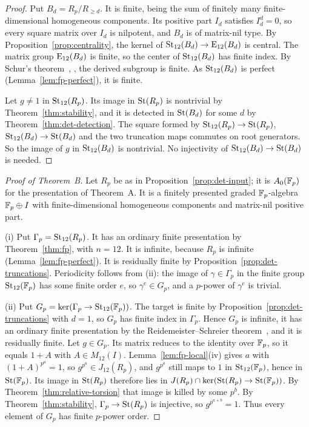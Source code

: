 \begin{proof}
Put $B_d=R_p/R_{\geq d}$. It is finite, being the sum of finitely many finite-dimensional homogeneous components. Its
positive part $I_d$ satisfies $I_d^d=0$, so every square matrix over $I_d$ is nilpotent, and $B_d$ is of matrix-nil
type. By Proposition~\ref{prop:centrality}, the kernel of $\operatorname{St}_{12}(B_d)\to\operatorname{E}_{12}(B_d)$ is central. The matrix group
$\operatorname{E}_{12}(B_d)$ is finite, so the center of $\operatorname{St}_{12}(B_d)$ has finite index. By Schur's theorem~\cite{Schur1904},
\cite[Theorem~10.1.4]{Robinson1996}, the derived subgroup is finite. As $\operatorname{St}_{12}(B_d)$ is perfect
(Lemma~\ref{lem:fp-perfect}), it is finite.

Let $g\neq1$ in $\operatorname{St}_{12}(R_p)$. Its image in $\operatorname{St}(R_p)$ is nontrivial by Theorem~\ref{thm:stability}, and it is detected
in $\operatorname{St}(B_d)$ for some $d$ by Theorem~\ref{thm:det-detection}. The square formed by $\operatorname{St}_{12}(R_p)\to\operatorname{St}(R_p)$,
$\operatorname{St}_{12}(B_d)\to\operatorname{St}(B_d)$ and the two truncation maps commutes on root generators. So the image of $g$ in
$\operatorname{St}_{12}(B_d)$ is nontrivial. No injectivity of $\operatorname{St}_{12}(B_d)\to\operatorname{St}(B_d)$ is needed.
\end{proof}

\begin{proof}[Proof of Theorem~B]
Let $R_p$ be as in Proposition~\ref{prop:det-input}; it is $A_0(\mathbb F_p)$ for the presentation of Theorem~A. It is a
finitely presented graded $\mathbb F_p$-algebra $\mathbb F_p\oplus I$ with finite-dimensional homogeneous components and matrix-nil
positive part.

(i) Put $\Gamma_p=\operatorname{St}_{12}(R_p)$. It has an ordinary finite presentation by Theorem~\ref{thm:fp}, with $n=12$. It is
infinite, because $R_p$ is infinite (Lemma~\ref{lem:fp-perfect}). It is residually finite by
Proposition~\ref{prop:det-truncations}. Periodicity follows from (ii): the image of $\gamma\in\Gamma_p$ in the finite
group $\operatorname{St}_{12}(\mathbb F_p)$ has some finite order $e$, so $\gamma^e\in G_p$, and a $p$-power of $\gamma^e$ is trivial.

(ii) Put $G_p=\ker(\Gamma_p\to\operatorname{St}_{12}(\mathbb F_p))$. The target is finite by Proposition~\ref{prop:det-truncations} with
$d=1$, so $G_p$ has finite index in $\Gamma_p$. Hence $G_p$ is infinite, it has an ordinary finite presentation by the
Reidemeister--Schreier theorem~\cite[Chapter~II, Section~4]{LyndonSchupp1977}, and it is residually finite. Let
$g\in G_p$. Its matrix reduces to the identity over $\mathbb F_p$, so it equals $1+A$ with $A\in M_{12}(I)$. Lemma~\ref{lem:fp-local}(iv)
gives $a$ with $(1+A)^{p^a}=1$, so $g^{p^a}\in J_{12}(R_p)$, and $g^{p^a}$ still maps to $1$ in $\operatorname{St}_{12}(\mathbb F_p)$, hence in
$\operatorname{St}(\mathbb F_p)$. Its image in $\operatorname{St}(R_p)$ therefore lies in $J(R_p)\cap\ker(\operatorname{St}(R_p)\to\operatorname{St}(\mathbb F_p))$. By
Theorem~\ref{thm:relative-torsion} that image is killed by some $p^b$. By Theorem~\ref{thm:stability},
$\Gamma_p\to\operatorname{St}(R_p)$ is injective, so $g^{p^{a+b}}=1$. Thus every element of $G_p$ has finite $p$-power order.
\end{proof}

